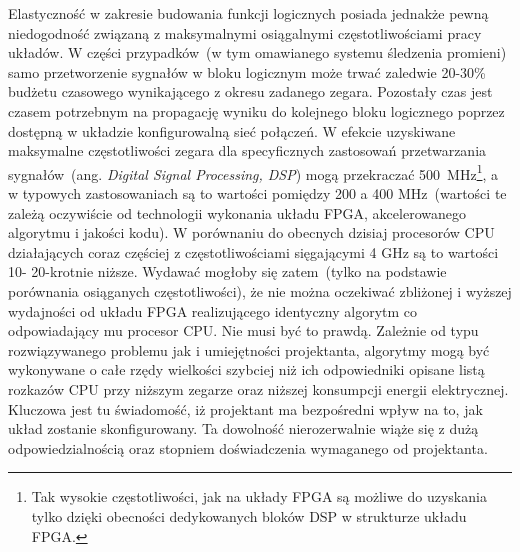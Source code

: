 Elastyczność w zakresie budowania funkcji logicznych posiada jednakże pewną niedogodność związaną z maksymalnymi osiągalnymi częstotliwościami pracy układów. W części przypadków~(w tym omawianego systemu śledzenia promieni) samo przetworzenie sygnałów w bloku logicznym może trwać zaledwie 20-30\% budżetu czasowego wynikającego z okresu zadanego zegara. Pozostały czas jest czasem potrzebnym na propagację wyniku do kolejnego bloku logicznego poprzez dostępną w układzie konfigurowalną sieć połączeń. W efekcie uzyskiwane maksymalne częstotliwości zegara dla specyficznych zastosowań przetwarzania sygnałów~(ang. \textit{Digital Signal Processing, DSP}) mogą przekraczać 500~MHz\footnote{Tak wysokie częstotliwości, jak na układy FPGA są możliwe do uzyskania tylko dzięki obecności dedykowanych bloków DSP w strukturze układu FPGA.}, a w typowych zastosowaniach są to wartości pomiędzy 200 a 400 MHz~(wartości te zależą oczywiście od technologii wykonania układu FPGA, akcelerowanego algorytmu i jakości kodu). W porównaniu do obecnych dzisiaj procesorów CPU działających coraz częściej z częstotliwościami sięgającymi 4 GHz są to wartości 10- 20-krotnie niższe. Wydawać mogłoby się zatem~(tylko na podstawie porównania osiąganych częstotliwości), że nie można oczekiwać zbliżonej i wyższej wydajności od układu FPGA realizującego identyczny algorytm co odpowiadający mu procesor CPU. Nie musi być to prawdą. Zależnie od typu rozwiązywanego problemu jak i umiejętności projektanta, algorytmy mogą być wykonywane o całe rzędy wielkości szybciej niż ich odpowiedniki opisane listą rozkazów CPU przy niższym zegarze oraz niższej konsumpcji energii elektrycznej. Kluczowa jest tu świadomość, iż projektant ma bezpośredni wpływ na to, jak układ zostanie skonfigurowany. Ta dowolność nierozerwalnie wiąże się z dużą odpowiedzialnością oraz stopniem doświadczenia wymaganego od projektanta.

